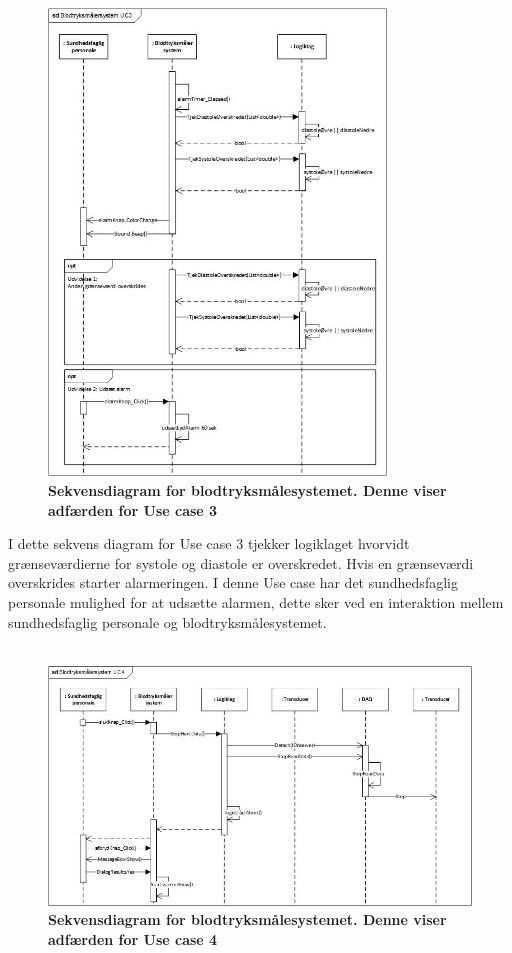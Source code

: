 \begin{figure}[H]
\includegraphics[width =0.8\textwidth , center]{billeder/sdUC3}
\caption{\textbf{Sekvensdiagram for blodtryksmålesystemet. Denne viser adfærden for Use case 3}}
\end{figure}
I dette sekvens diagram for Use case 3 tjekker logiklaget hvorvidt grænseværdierne for systole og diastole er overskredet. Hvis en grænseværdi overskrides starter alarmeringen. I denne Use case har det sundhedsfaglig personale mulighed for at udsætte alarmen, dette sker ved en interaktion mellem sundhedsfaglig personale og blodtryksmålesystemet.\\\\ 
\begin{figure}[H]
\includegraphics[width =1.0\textwidth , center]{billeder/sdUC4}
\caption{\textbf{Sekvensdiagram for blodtryksmålesystemet. Denne viser adfærden for Use case 4}}
\end{figure}
